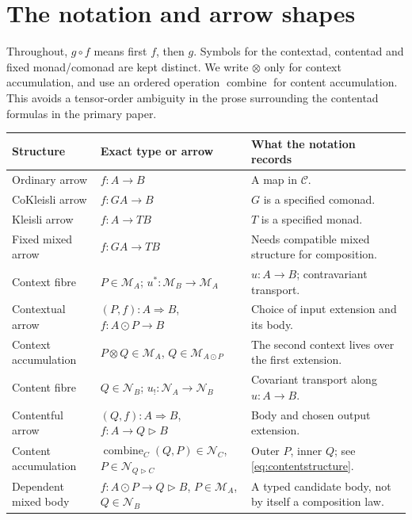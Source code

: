 \documentclass[11pt,letterpaper]{article}
\newcommand{\comp}{\mathbin{\circ}}
\newcommand{\ext}{\mathbin{\odot}}
\newcommand{\cext}{\mathbin{\triangleright}}
\newcommand{\comb}{\operatorname{combine}}
\begin{document}
\section{The notation and arrow shapes}
\label{sec:notation}
Throughout, $g\comp f$ means first $f$, then $g$. Symbols for the contextad, contentad and fixed monad/comonad are kept distinct. We write $\otimes$ only for context accumulation, and use an ordered operation $\comb$ for content accumulation. This avoids a tensor-order ambiguity in the prose surrounding the contentad formulas in the primary paper.

\begin{longtable}{@{}p{}p{}p{}@{}}
\toprule
Structure & Exact type or arrow & What the notation records \\
\midrule
\endhead
Ordinary arrow & $f:A\to B$ & A map in $\mathcal C$. \\
CoKleisli arrow & $f:GA\to B$ & $G$ is a specified comonad. \\
Kleisli arrow & $f:A\to TB$ & $T$ is a specified monad. \\
Fixed mixed arrow & $f:GA\to TB$ & Needs compatible mixed structure for composition. \\
Context fibre & $P\in\mathcal M_A$; $u^*:\mathcal M_B\to\mathcal M_A$ & $u:A\to B$; contravariant transport. \\
Contextual arrow & $(P,f):A\Rightarrow B$, $f:A\ext P\to B$ & Choice of input extension and its body. \\
Context accumulation & $P\otimes Q\in\mathcal M_A$, $Q\in\mathcal M_{A\ext P}$ & The second context lives over the first extension. \\
Content fibre & $Q\in\mathcal N_B$; $u_!:\mathcal N_A\to\mathcal N_B$ & Covariant transport along $u:A\to B$. \\
Contentful arrow & $(Q,f):A\Rightarrow B$, $f:A\to Q\cext B$ & Body and chosen output extension. \\
Content accumulation & $\comb_C(Q,P)\in\mathcal N_C$, $P\in\mathcal N_{Q\cext C}$ & Outer $P$, inner $Q$; see \eqref{eq:contentstructure}. \\
Dependent mixed body & $f:A\ext P\to Q\cext B$, $P\in\mathcal M_A$, $Q\in\mathcal N_B$ & A typed candidate body, not by itself a composition law. \\
\bottomrule
\end{longtable}
\end{document}
